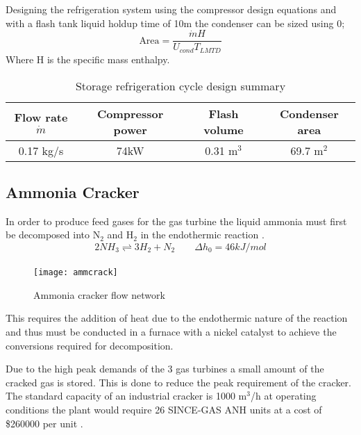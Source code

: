 Designing the refrigeration system using the compressor design equations and with a flash tank liquid holdup time of 10m the condenser can be sized using \cite{Morgan2013}0;
\begin{equation}
	\text{Area} = \frac{\dot{m}H}{U_{cond}T_{LMTD}}
\end{equation}
Where H is the specific mass enthalpy.
\begin{table}[!htbp]
	\begin{center}
		\caption{Storage refrigeration cycle design summary}
		\begin{tabular}{ |c|c|c|c| }
			\hline
			
			Flow rate $\dot{m}$ & Compressor power&Flash volume &Condenser area\\
			\hline
			0.17 kg/s& 74kW & 0.31 m$^3$ &69.7 m$^2$ \\
		
			
			\hline
		\end{tabular}
	\end{center}
\end{table}
\subsection{Ammonia Cracker}
In order to produce feed gases for the gas turbine the liquid ammonia must first be decomposed into N$_2$ and H$_2$ in the endothermic reaction \cite{Kim2012}. 
\begin{equation}
2NH_3   \underset{ }{\stackrel{ }{\rightleftharpoons}}   3H_2 + N_2 \qquad \Delta h_0 = 46 kJ/mol 
\end{equation}

\begin{wrapfigure}{r}{0.36\textwidth}
	\centering
	\texttt{[image: ammcrack]}
	\caption{Ammonia cracker flow network}
\end{wrapfigure}

This requires the addition of heat due to the endothermic nature of the reaction and thus must be conducted in a furnace with a nickel catalyst to achieve the conversions required for decomposition.

Due to the high peak demands of the 3 gas turbines a small amount of the cracked gas is stored. This is done to reduce the peak requirement of the cracker. The standard capacity of an industrial cracker is 1000 m$^3$/h at operating conditions the plant would require 26 SINCE-GAS ANH units  at a cost of \$260000 per unit \cite{SinceGas2018}. 

